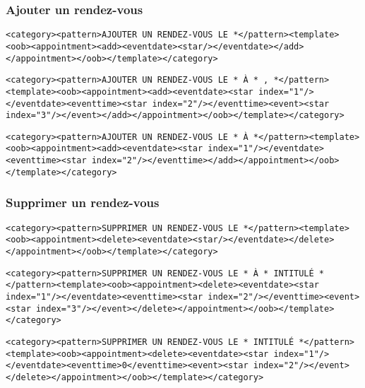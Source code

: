 \subsubsection{Ajouter un rendez-vous}
\begin{lstlisting}[frame=none,aboveskip=0.5em]
<category><pattern>AJOUTER UN RENDEZ-VOUS LE *</pattern><template><oob><appointment><add><eventdate><star/></eventdate></add></appointment></oob></template></category>
\end{lstlisting}

\begin{lstlisting}[frame=none,aboveskip=0.5em]
<category><pattern>AJOUTER UN RENDEZ-VOUS LE * À * , *</pattern><template><oob><appointment><add><eventdate><star index="1"/></eventdate><eventtime><star index="2"/></eventtime><event><star index="3"/></event></add></appointment></oob></template></category>
\end{lstlisting}

\begin{lstlisting}[frame=none,aboveskip=0.5em]
<category><pattern>AJOUTER UN RENDEZ-VOUS LE * À *</pattern><template><oob><appointment><add><eventdate><star index="1"/></eventdate><eventtime><star index="2"/></eventtime></add></appointment></oob></template></category>
\end{lstlisting}

\subsubsection{Supprimer un rendez-vous}
\begin{lstlisting}[frame=none,aboveskip=0.5em]
<category><pattern>SUPPRIMER UN RENDEZ-VOUS LE *</pattern><template><oob><appointment><delete><eventdate><star/></eventdate></delete></appointment></oob></template></category>
\end{lstlisting}

\begin{lstlisting}[frame=none,aboveskip=0.5em]
<category><pattern>SUPPRIMER UN RENDEZ-VOUS LE * À * INTITULÉ *</pattern><template><oob><appointment><delete><eventdate><star index="1"/></eventdate><eventtime><star index="2"/></eventtime><event><star index="3"/></event></delete></appointment></oob></template></category>
\end{lstlisting}

\begin{lstlisting}[frame=none,aboveskip=0.5em]
<category><pattern>SUPPRIMER UN RENDEZ-VOUS LE * INTITULÉ *</pattern><template><oob><appointment><delete><eventdate><star index="1"/></eventdate><eventtime>0</eventtime><event><star index="2"/></event></delete></appointment></oob></template></category>
\end{lstlisting}

